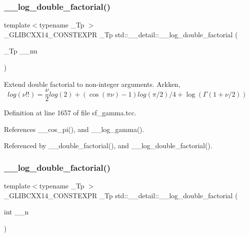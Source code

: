 \subsubsection{\texorpdfstring{\+\_\+\+\_\+log\+\_\+double\+\_\+factorial()}{\_\_log\_double\_factorial()}\hspace{0.1cm}{\footnotesize\ttfamily [1/2]}}
{\footnotesize\ttfamily template$<$typename \+\_\+\+Tp $>$ \\
\+\_\+\+G\+L\+I\+B\+C\+X\+X14\+\_\+\+C\+O\+N\+S\+T\+E\+X\+PR \+\_\+\+Tp std\+::\+\_\+\+\_\+detail\+::\+\_\+\+\_\+log\+\_\+double\+\_\+factorial (\begin{DoxyParamCaption}\item[{\+\_\+\+Tp}]{\+\_\+\+\_\+nu }\end{DoxyParamCaption})}

Extend double factorial to non-\/integer arguments. Arkken, \[ log(\nu!!) = \frac{\nu}{2} log(2) + \left(\cos(\pi\nu) - 1\right) log(\pi/2) / 4 + \log(\Gamma(1 + \nu/2)) \] 

Definition at line 1657 of file sf\+\_\+gamma.\+tcc.



References \+\_\+\+\_\+cos\+\_\+pi(), and \+\_\+\+\_\+log\+\_\+gamma().



Referenced by \+\_\+\+\_\+double\+\_\+factorial(), and \+\_\+\+\_\+log\+\_\+double\+\_\+factorial().

\mbox{\label{namespacestd_1_1____detail_aa832ed1d29fd41c40cf892cc1feef7e9}} 
\subsubsection{\texorpdfstring{\+\_\+\+\_\+log\+\_\+double\+\_\+factorial()}{\_\_log\_double\_factorial()}\hspace{0.1cm}{\footnotesize\ttfamily [2/2]}}
{\footnotesize\ttfamily template$<$typename \+\_\+\+Tp $>$ \\
\+\_\+\+G\+L\+I\+B\+C\+X\+X14\+\_\+\+C\+O\+N\+S\+T\+E\+X\+PR \+\_\+\+Tp std\+::\+\_\+\+\_\+detail\+::\+\_\+\+\_\+log\+\_\+double\+\_\+factorial (\begin{DoxyParamCaption}\item[{int}]{\+\_\+\+\_\+n }\end{DoxyParamCaption})}



